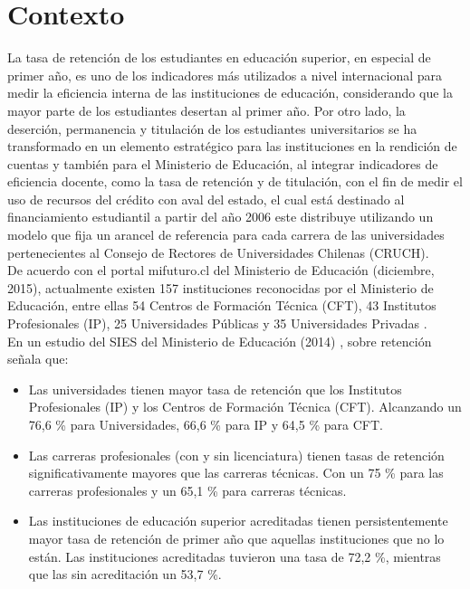 \section{Contexto}
\label{sec:contexto}
La tasa de retención de los estudiantes en educación superior, en especial de primer año, es uno de los indicadores más utilizados a nivel internacional para medir la eficiencia interna de las instituciones de educación, considerando que la mayor parte de los estudiantes desertan al primer año. Por otro lado, la deserción, permanencia y titulación de los estudiantes universitarios se ha transformado en un elemento estratégico para las instituciones en la rendición de cuentas y también para el Ministerio de Educación, al integrar indicadores de eficiencia docente, como la tasa de retención y de titulación, con el fin de medir el uso de recursos del crédito con aval del estado, el cual está destinado al financiamiento estudiantil a partir del año 2006 este distribuye utilizando un modelo que fija un arancel de referencia para cada carrera de las universidades pertenecientes al Consejo de Rectores de Universidades Chilenas (CRUCH).\\


De acuerdo con el portal mifuturo.cl del Ministerio de Educación (diciembre, 2015), actualmente existen 157 instituciones reconocidas por el Ministerio de Educación, entre ellas 54 Centros de Formación Técnica (CFT), 43 Institutos Profesionales (IP), 25 Universidades Públicas y 35 Universidades Privadas \cite{instituciones}.\\

En un estudio del SIES del Ministerio de Educación (2014) \cite{Sies2014}, sobre retención señala que:

\begin{itemize}
    \item Las universidades tienen mayor tasa de retención que los Institutos Profesionales (IP) y los Centros de Formación Técnica (CFT). Alcanzando un 76,6 \% para Universidades, 66,6 \% para IP y 64,5 \% para CFT.
    
    \item Las carreras profesionales (con y sin licenciatura) tienen tasas de retención significativamente mayores que las carreras técnicas. Con un 75 \% para las carreras profesionales y un 65,1 \% para carreras técnicas.
    
    \item Las instituciones de educación superior acreditadas tienen persistentemente mayor tasa de retención de primer año que aquellas instituciones que no lo están. Las instituciones acreditadas tuvieron una tasa de 72,2 \%, mientras que las sin acreditación un 53,7 \%.
    
\end{itemize}

